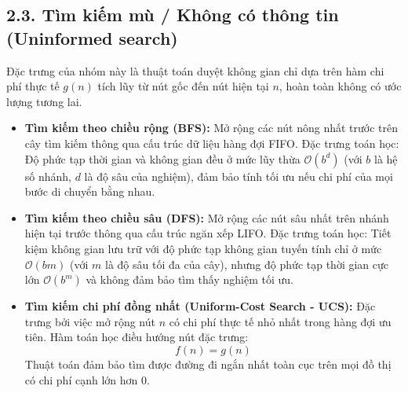 \documentclass[../main.tex]{subfiles}
\begin{document}
\subsection{2.3. Tìm kiếm mù / Không có thông tin (Uninformed search)}
Đặc trưng của nhóm này là thuật toán duyệt không gian chỉ dựa trên hàm chi phí thực tế $g(n)$ tích lũy từ nút gốc đến nút hiện tại $n$, hoàn toàn không có ước lượng tương lai.
\begin{itemize}
    \item \textbf{Tìm kiếm theo chiều rộng (BFS):} Mở rộng các nút nông nhất trước trên cây tìm kiếm thông qua cấu trúc dữ liệu hàng đợi FIFO. Đặc trưng toán học: Độ phức tạp thời gian và không gian đều ở mức lũy thừa $\mathcal{O}(b^d)$ (với $b$ là hệ số nhánh, $d$ là độ sâu của nghiệm), đảm bảo tính tối ưu nếu chi phí của mọi bước di chuyển bằng nhau.
    \item \textbf{Tìm kiếm theo chiều sâu (DFS):} Mở rộng các nút sâu nhất trên nhánh hiện tại trước thông qua cấu trúc ngăn xếp LIFO. Đặc trưng toán học: Tiết kiệm không gian lưu trữ với độ phức tạp không gian tuyến tính chỉ ở mức $\mathcal{O}(bm)$ (với $m$ là độ sâu tối đa của cây), nhưng độ phức tạp thời gian cực lớn $\mathcal{O}(b^m)$ và không đảm bảo tìm thấy nghiệm tối ưu.
    \item \textbf{Tìm kiếm chi phí đồng nhất (Uniform-Cost Search - UCS):} Đặc trưng bởi việc mở rộng nút $n$ có chi phí thực tế nhỏ nhất trong hàng đợi ưu tiên. Hàm toán học điều hướng nút đặc trưng:
    \begin{equation}
        f(n) = g(n)
    \end{equation}
    Thuật toán đảm bảo tìm được đường đi ngắn nhất toàn cục trên mọi đồ thị có chi phí cạnh lớn hơn 0.
\end{itemize}
\end{document}
